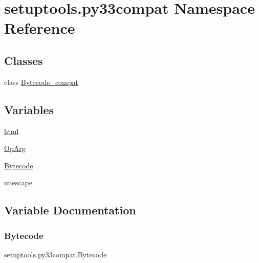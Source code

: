 \hypertarget{namespacesetuptools_1_1py33compat}{}\section{setuptools.\+py33compat Namespace Reference}
\label{namespacesetuptools_1_1py33compat}
\subsection*{Classes}
\begin{DoxyCompactItemize}
\item 
class \hyperlink{classsetuptools_1_1py33compat_1_1_bytecode__compat}{Bytecode\+\_\+compat}
\end{DoxyCompactItemize}
\subsection*{Variables}
\begin{DoxyCompactItemize}
\item 
\hyperlink{namespacesetuptools_1_1py33compat_a739305bbe8243806f6eb296c33d398ea}{html}
\item 
\hyperlink{namespacesetuptools_1_1py33compat_aab433aba2df5d81f537b8d76c67b3dc4}{Op\+Arg}
\item 
\hyperlink{namespacesetuptools_1_1py33compat_ac9a06e4bca9785d08e7e64b9b50fab6d}{Bytecode}
\item 
\hyperlink{namespacesetuptools_1_1py33compat_a5f7a066d8804b255c78d413b8d4eb8b8}{unescape}
\end{DoxyCompactItemize}


\subsection{Variable Documentation}
\mbox{\label{namespacesetuptools_1_1py33compat_ac9a06e4bca9785d08e7e64b9b50fab6d}} 
\subsubsection{\texorpdfstring{Bytecode}{Bytecode}}
{\footnotesize\ttfamily setuptools.\+py33compat.\+Bytecode}

\mbox{\label{namespacesetuptools_1_1py33compat_a739305bbe8243806f6eb296c33d398ea}} 
